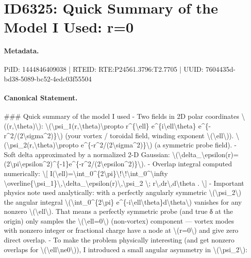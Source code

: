 \section*{ID6325: Quick Summary of the Model I Used: r=0}
\paragraph{Metadata.}
PiID: 1444846409038 | RTEID: RTE:P24561.3796:T2.7705 | UUID: 7604435d-bd38-5089-bc52-4edc03f55504

\paragraph{Canonical Statement.}
\#\#\# Quick summary of the model I used - Two fields in 2D polar coordinates \textbackslash{}((r,\textbackslash{}theta)\textbackslash{}): \textbackslash{}(\textbackslash{}psi\_1(r,\textbackslash{}theta)\textbackslash{}propto r\textasciicircum{}\{\textbackslash{}ell\} e\textasciicircum{}\{i\textbackslash{}ell\textbackslash{}theta\} e\textasciicircum{}\{-r\textasciicircum{}2/(2\textbackslash{}sigma\textasciicircum{}2)\}\textbackslash{}) (your vortex / toroidal field, winding exponent \textbackslash{}(\textbackslash{}ell\textbackslash{})). \textbackslash{}(\textbackslash{}psi\_2(r,\textbackslash{}theta)\textbackslash{}propto e\textasciicircum{}\{-r\textasciicircum{}2/(2\textbackslash{}sigma\textasciicircum{}2)\}\textbackslash{}) (a symmetric probe field). - Soft delta approximated by a normalized 2-D Gaussian: \textbackslash{}(\textbackslash{}delta\_\textbackslash{}epsilon(r)=(2\textbackslash{}pi\textbackslash{}epsilon\textasciicircum{}2)\textasciicircum{}\{-1\}e\textasciicircum{}\{-r\textasciicircum{}2/(2\textbackslash{}epsilon\textasciicircum{}2)\}\textbackslash{}). - Overlap integral computed numerically: \textbackslash{}[ I(\textbackslash{}ell)=\textbackslash{}int\_0\textasciicircum{}\{2\textbackslash{}pi\}\textbackslash{}!\textbackslash{}!\textbackslash{}int\_0\textasciicircum{}\textbackslash{}infty \textbackslash{}overline\{\textbackslash{}psi\_1\}\textbackslash{},\textbackslash{}delta\_\textbackslash{}epsilon(r)\textbackslash{},\textbackslash{}psi\_2 \textbackslash{}; r\textbackslash{},dr\textbackslash{},d\textbackslash{}theta . \textbackslash{}] - Important physics note used analytically: with a perfectly angularly symmetric \textbackslash{}(\textbackslash{}psi\_2\textbackslash{}) the angular integral \textbackslash{}(\textbackslash{}int\_0\textasciicircum{}\{2\textbackslash{}pi\} e\textasciicircum{}\{-i\textbackslash{}ell\textbackslash{}theta\}d\textbackslash{}theta\textbackslash{}) vanishes for any nonzero \textbackslash{}(\textbackslash{}ell\textbackslash{}). That means a perfectly symmetric probe (and true δ at the origin) only samples the \textbackslash{}(\textbackslash{}ell=0\textbackslash{}) (non-vortex) component — vortex modes with nonzero integer or fractional charge have a node at \textbackslash{}(r=0\textbackslash{}) and give zero direct overlap. - To make the problem physically interesting (and get nonzero overlaps for \textbackslash{}(\textbackslash{}ell\textbackslash{}ne0\textbackslash{})), I introduced a small angular asymmetry in \textbackslash{}(\textbackslash{}psi\_2\textbackslash{}): 